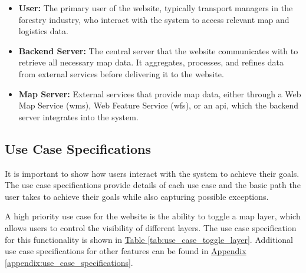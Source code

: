 \begin{itemize}
    \item \textbf{User:} The primary user of the website, typically transport managers in the forestry industry, who interact with the system to access relevant map and logistics data.
    \item \textbf{Backend Server:} The central server that the website communicates with to retrieve all necessary map data. It aggregates, processes, and refines data from external services before delivering it to the website.
    \item \textbf{Map Server:} External services that provide map data, either through a Web Map Service (\Gls{wms}), Web Feature Service (\Gls{wfs}), or an \acrshort{api}, which the backend server integrates into the system.
\end{itemize}

\subsection{Use Case Specifications}

It is important to show how users interact with the system to achieve their goals. The use case specifications provide details of each use case and the basic path the user takes to achieve their goals while also capturing possible exceptions. 

A high priority use case for the website is the ability to toggle a map layer, which allows users to control the visibility of different layers. The use case specification for this functionality is shown in \hyperref[tab:use_case_toggle_layer]{Table \ref*{tab:use_case_toggle_layer}}. Additional use case specifications for other features can be found in \hyperref[appendix:use_case_specifications]{Appendix \ref*{appendix:use_case_specifications}}.

